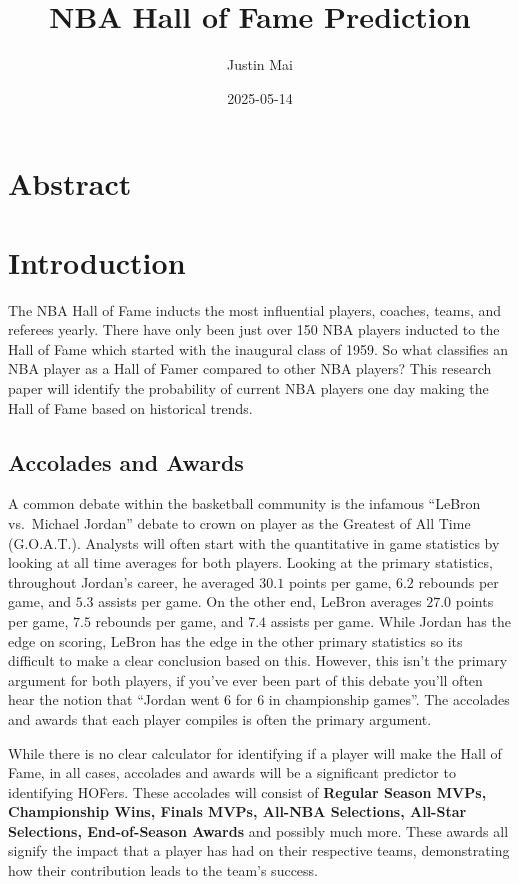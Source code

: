 \documentclass[
  11pt,
]{article}
\title{NBA Hall of Fame Prediction}
\author{Justin Mai}
\date{2025-05-14}
\begin{document}
\maketitle

{
\setcounter{tocdepth}{2}
\tableofcontents
}
\newpage

\section{Abstract}\label{abstract}

\newpage

\section{Introduction}\label{introduction}

The NBA Hall of Fame inducts the most influential players, coaches,
teams, and referees yearly. There have only been just over 150 NBA
players inducted to the Hall of Fame which started with the inaugural
class of 1959. So what classifies an NBA player as a Hall of Famer
compared to other NBA players? This research paper will identify the
probability of current NBA players one day making the Hall of Fame based
on historical trends.

\subsection{Accolades and Awards}\label{accolades-and-awards}

A common debate within the basketball community is the infamous ``LeBron
vs.~Michael Jordan'' debate to crown on player as the Greatest of All
Time (G.O.A.T.). Analysts will often start with the quantitative in game
statistics by looking at all time averages for both players. Looking at
the primary statistics, throughout Jordan's career, he averaged \(30.1\)
points per game, \(6.2\) rebounds per game, and \(5.3\) assists per
game. On the other end, LeBron averages \(27.0\) points per game,
\(7.5\) rebounds per game, and \(7.4\) assists per game. While Jordan
has the edge on scoring, LeBron has the edge in the other primary
statistics so its difficult to make a clear conclusion based on this.
However, this isn't the primary argument for both players, if you've
ever been part of this debate you'll often hear the notion that ``Jordan
went 6 for 6 in championship games''. The accolades and awards that each
player compiles is often the primary argument.

While there is no clear calculator for identifying if a player will make
the Hall of Fame, in all cases, accolades and awards will be a
significant predictor to identifying HOFers. These accolades will
consist of \textbf{Regular Season MVPs, Championship Wins, Finals MVPs,
All-NBA Selections, All-Star Selections, End-of-Season Awards} and
possibly much more. These awards all signify the impact that a player
has had on their respective teams, demonstrating how their contribution
leads to the team's success.
\end{document}
